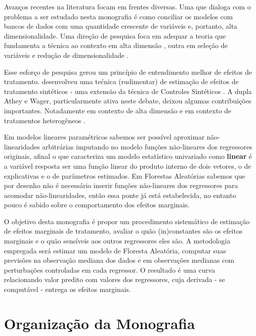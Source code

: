 Avanços recentes na literatura focam em frentes diversas. Uma que dialoga com o problema a ser estudado nesta monografia é como conciliar os modelos com bancos de dados com uma quantidade crescente de variáveis e, portanto, alta dimensionalidade. Uma direção de pesquisa foca em adequar a teoria que fundamenta a técnica ao contexto em alta dimensão \cite{athey2019generalized}, outra em seleção de variáveis e redução de dimensionalidade \cite{hastie2015statistical}. 

Esse esforço de pesquisa gerou um princípio de entendimento melhor de efeitos de tratamento.  desenvolveu uma tećnica (rudimentar) de estimação de efeitos de tratamento sintéticos - uma extensão da técnica de Controles Sintéticos \cite{abadie2010synthetic}. A dupla Athey e Wager, particularmente ativa neste debate, deixou algumas contribuições importantes. Notadamente em contexto de alta dimensão \cite{athey2018approximate} e em contexto de tratamentos heterogêneos \cite{wager2018estimation}. 

Em modelos lineares paramétricos sabemos ser possível aproximar não-linearidades arbitrárias imputando no modelo funções não-lineares dos regressores originais, afinal o que caracteriza um modelo estatístico univariado como \textbf{linear} é a variável resposta ser uma função linear do produto interno de dois vetores, o de explicativas e o de parâmetros estimados. Em Florestas Aleatórias sabemos que por desenho não é necessário inserir funções não-lineares dos regressores para acomodar não-linearidades, então essa ponte já está estabelecida, no entanto pouco é sabido sobre o comportamento dos efeitos marginais.

O objetivo desta monografia é propor um procedimento sistemático de estimação de efeitos marginais de tratamento, avaliar o quão (in)constantes são os efeitos marginais e o quão sensíveis aos outros regressores eles são. A metodologia empregada será estimar um modelo de Floresta Aleatória, computar suas previsões na observação mediana dos dados e em observações medianas com perturbações controladas em cada regressor. O resultado é uma curva relacionando valor predito com valores dos regressores, cuja derivada - se computável - entrega os efeitos marginais.


 
 \section{Organização da Monografia}
 
